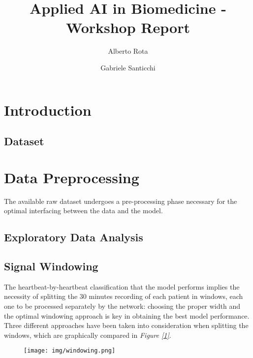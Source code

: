 \documentclass[conference]{IEEEtran}
\newcommand{\fig}[1]{\textit{Figure \ref{1}}}
\begin{document}
\title{Applied AI in Biomedicine - Workshop Report}

\author{
Alberto Rota
\\
\and
Gabriele Santicchi 
}
\maketitle

\section{Introduction}
\subsection{Dataset}

\section{Data Preprocessing}
The available raw dataset undergoes a pre-processing phase necessary for the
optimal interfacing between the data and the model.
\subsection{Exploratory Data Analysis}

\subsection{Signal Windowing}
The heartbeat-by-heartbeat classification that the model performs implies the
necessity of splitting the 30 minutes recording of each patient in windows, each
one to be processed separately by the network:
choosing the proper width and the optimal windowing approach is key in
obtaining the best model performance. Three different approaches have been taken
into consideration when splitting the windows, which are graphically compared in
\fig{fig:windows}.
\begin{figure}
    \texttt{[image: img/windowing.png]}
    \label{fig:windows}
\end{figure}
\end{document}
